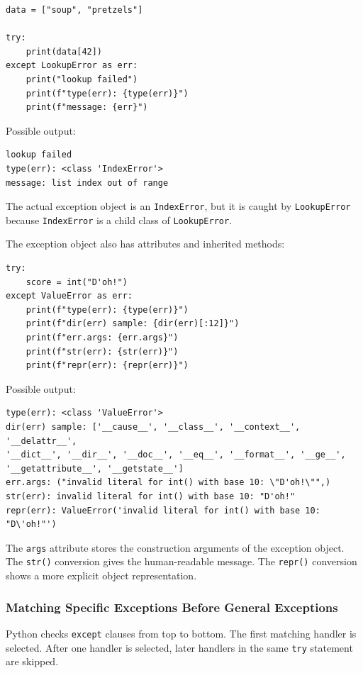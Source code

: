 \documentclass[a4paper,twoside]{report}
\begin{document}
\begin{verbatim}
data = ["soup", "pretzels"]

try:
    print(data[42])
except LookupError as err:
    print("lookup failed")
    print(f"type(err): {type(err)}")
    print(f"message: {err}")
\end{verbatim}

Possible output:

\begin{verbatim}
lookup failed
type(err): <class 'IndexError'>
message: list index out of range
\end{verbatim}

The actual exception object is an \texttt{IndexError}, but it is caught by \texttt{LookupError} because \texttt{IndexError} is a child class of \texttt{LookupError}.

The exception object also has attributes and inherited methods:

\begin{verbatim}
try:
    score = int("D'oh!")
except ValueError as err:
    print(f"type(err): {type(err)}")
    print(f"dir(err) sample: {dir(err)[:12]}")
    print(f"err.args: {err.args}")
    print(f"str(err): {str(err)}")
    print(f"repr(err): {repr(err)}")
\end{verbatim}

Possible output:

\begin{verbatim}
type(err): <class 'ValueError'>
dir(err) sample: ['__cause__', '__class__', '__context__', '__delattr__',
'__dict__', '__dir__', '__doc__', '__eq__', '__format__', '__ge__',
'__getattribute__', '__getstate__']
err.args: ("invalid literal for int() with base 10: \"D'oh!\"",)
str(err): invalid literal for int() with base 10: "D'oh!"
repr(err): ValueError('invalid literal for int() with base 10: "D\'oh!"')
\end{verbatim}

The \texttt{args} attribute stores the construction arguments of the exception object. The \texttt{str()} conversion gives the human-readable message. The \texttt{repr()} conversion shows a more explicit object representation.

\subsubsection{Matching Specific Exceptions Before General Exceptions}

Python checks \texttt{except} clauses from top to bottom. The first matching handler is selected. After one handler is selected, later handlers in the same \texttt{try} statement are skipped.
\end{document}
